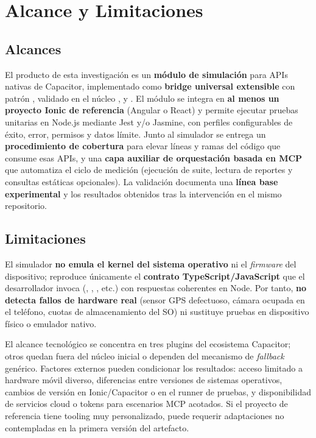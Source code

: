 \section{Alcance y Limitaciones}
\label{chap:alcance_limitaciones}

\subsection{Alcances}
\label{sec:alcances}

El producto de esta investigación es un \textbf{módulo de simulación} para APIs nativas de Capacitor, implementado como \textbf{bridge universal extensible} con patrón , validado en el núcleo ,  y . El módulo se integra en \textbf{al menos un proyecto Ionic de referencia} (Angular o React) y permite ejecutar pruebas unitarias en Node.js mediante Jest y/o Jasmine, con perfiles configurables de éxito, error, permisos y datos límite. Junto al simulador se entrega un \textbf{procedimiento de cobertura} para elevar líneas y ramas del código que consume esas APIs, y una \textbf{capa auxiliar de orquestación basada en MCP} que automatiza el ciclo de medición (ejecución de suite, lectura de reportes y consultas estáticas opcionales). La validación documenta una \textbf{línea base experimental} y los resultados obtenidos tras la intervención en el mismo repositorio.

\subsection{Limitaciones}
\label{sec:limitaciones}

El simulador \textbf{no emula el kernel del sistema operativo} ni el \textit{firmware} del dispositivo; reproduce únicamente el \textbf{contrato TypeScript/JavaScript} que el desarrollador invoca (, , , etc.) con respuestas coherentes en Node. Por tanto, \textbf{no detecta fallos de hardware real} (sensor GPS defectuoso, cámara ocupada en el teléfono, cuotas de almacenamiento del SO) ni sustituye pruebas en dispositivo físico o emulador nativo.

El alcance tecnológico se concentra en tres plugins del ecosistema Capacitor; otros  quedan fuera del núcleo inicial o dependen del mecanismo de \textit{fallback} genérico. Factores externos pueden condicionar los resultados: acceso limitado a hardware móvil diverso, diferencias entre versiones de sistemas operativos, cambios de versión en Ionic/Capacitor o en el runner de pruebas, y disponibilidad de servicios cloud o tokens para escenarios MCP acotados. Si el proyecto de referencia tiene tooling muy personalizado, puede requerir adaptaciones no contempladas en la primera versión del artefacto.
